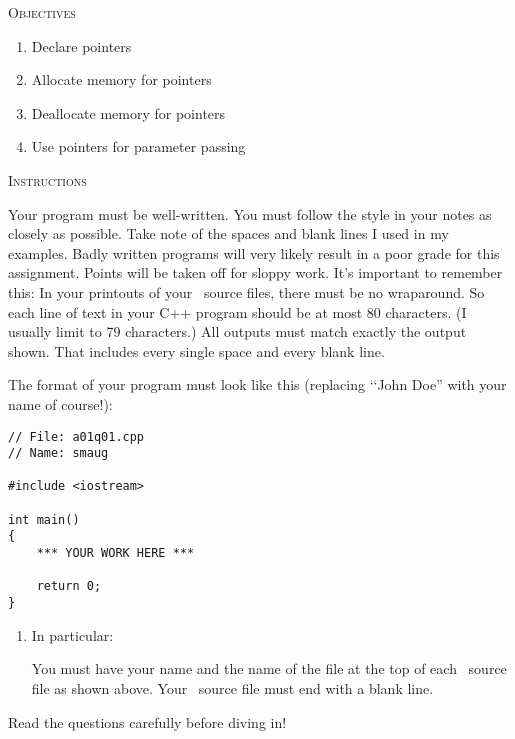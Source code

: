 


\renewcommand\TITLE{Assignment 4}


\topmatter

\textsc{Objectives}
 \begin{enumerate}[nosep]
 \item Declare pointers
 \item Allocate memory for pointers
 \item Deallocate memory for pointers
 \item Use pointers for parameter passing
 \end{enumerate}


\textsc{Instructions}
\begin{enumerate}
\li Your program must be well-written. 
    You must follow the style in your notes as closely as possible. 
    Take note of the spaces and blank lines I used in my examples. 
    Badly written programs will very likely result in a poor grade for this 
    assignment. 
    Points will be taken off for sloppy work. 
\li It's important to remember this: In your printouts of your \cpp\ source
files, 
    there must be no wraparound. So each line of text in your C++ program
    should be at most 80 characters. (I usually limit to 79 characters.)
\li All outputs must match exactly the output shown. 
    That includes every single space and every blank line.

\li The format of your program must look like this
(replacing \lq\lq John Doe'' with your name of course!):
\end{enumerate}
\begin{Verbatim}[frame=single]
// File: a01q01.cpp
// Name: smaug

#include <iostream>

int main()
{
    *** YOUR WORK HERE ***

    return 0;
}
\end{Verbatim}

\begin{enumerate}
\item[] In particular:
\begin{enumerate}
\li You must have your name and the name of the file at the top of each 
    \cpp\ source file as shown above.
\li Your \cpp\ source file must end with a blank line.
\end{enumerate}

\end{enumerate}

Read the questions carefully before diving in!

